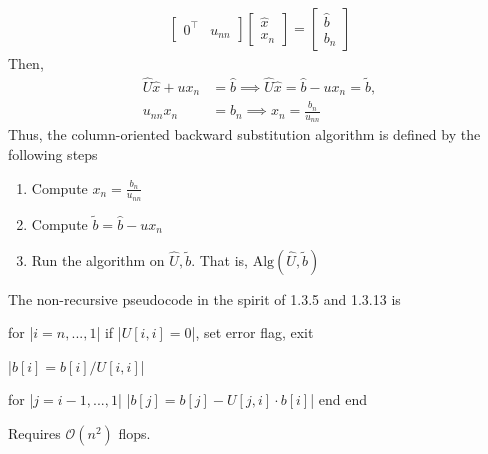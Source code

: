 \documentclass{report}
\begin{document}
\begin{itemize}
\begin{align*}
\begin{bmatrix}
                    0^{\top} & u_{nn}
                \end{bmatrix}
                \begin{bmatrix}
                    \hat{x} \\ x_{n}
                \end{bmatrix}
                = 
                \begin{bmatrix}
                    \hat{b} \\ b_{n}
                \end{bmatrix}
            \end{align*}
            Then,
            \begin{align*}
                \hat{U}\hat{x} + ux_{n} &= \hat{b} \implies \hat{U}\hat{x} = \hat{b} - ux_{n} = \tilde{b}, \\
                u_{nn}x_{n} &= b_{n} \implies x_{n} = \frac{b_{n}}{u_{nn}}
            \end{align*}
            Thus, the column-oriented backward substitution algorithm is defined by the following steps
            \begin{enumerate}
                \item Compute $x_{n} = \frac{b_{n}}{u_{nn}} $
                \item Compute $\tilde{b} = \hat{b} - ux_{n} $
                \item Run the algorithm on $\hat{U}, \tilde{b}$. That is, $\text{Alg}(\hat{U}, \tilde{b})$
            \end{enumerate}
            \bigbreak \noindent 
            The non-recursive pseudocode in the spirit of 1.3.5 and 1.3.13 is
            \bigbreak \noindent 
            \begin{jlcode}
                for |$i=n,...,1$|
                if |$U[i,i] = 0$|, set error flag, exit

                |$b[i] = b[i] / U[i,i]$|

                for |$j = i-1,...,1$|
                |$b[j] = b[j] - U[j,i] \cdot b[i]$|
                end
                end
            \end{jlcode}
            \bigbreak \noindent 
            Requires $\mathcal{O}(n^{2})$ flops.


\end{itemize}
\end{document}
